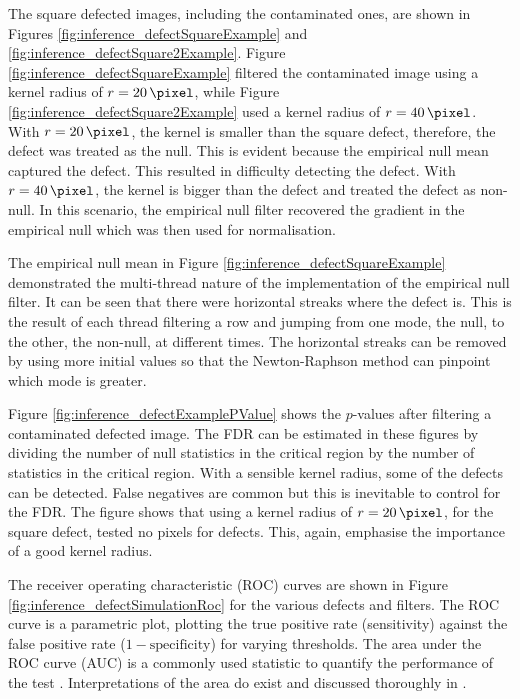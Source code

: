 The square defected images, including the contaminated ones, are shown in Figures \ref{fig:inference_defectSquareExample} and \ref{fig:inference_defectSquare2Example}. Figure \ref{fig:inference_defectSquareExample} filtered the contaminated image using a kernel radius of $r=\SI{20}{\pixel}$, while Figure \ref{fig:inference_defectSquare2Example} used a kernel radius of $r=\SI{40}{\pixel}$. With $r=\SI{20}{\pixel}$, the kernel is smaller than the square defect, therefore, the defect was treated as the null. This is evident because the empirical null mean captured the defect. This resulted in difficulty detecting the defect. With $r=\SI{40}{\pixel}$, the kernel is bigger than the defect and treated the defect as non-null. In this scenario, the empirical null filter recovered the gradient in the empirical null which was then used for normalisation.

The empirical null mean in Figure \ref{fig:inference_defectSquareExample} demonstrated the multi-thread nature of the implementation of the empirical null filter. It can be seen that there were horizontal streaks where the defect is. This is the result of each thread filtering a row and jumping from one mode, the null, to the other, the non-null, at different times. The horizontal streaks can be removed by using more initial values so that the Newton-Raphson method can pinpoint which mode is greater.

Figure \ref{fig:inference_defectExamplePValue} shows the $p$-values after filtering a contaminated defected image. The FDR can be estimated in these figures by dividing the number of null statistics in the critical region by the number of statistics in the critical region. With a sensible kernel radius, some of the defects can be detected. False negatives are common but this is inevitable to control for the FDR. The figure shows that using a kernel radius of $r=\SI{20}{\pixel}$, for the square defect, tested no pixels for defects. This, again, emphasise the importance of a good kernel radius. 

The receiver operating characteristic (ROC) curves \citep{green1966signal, metz1978basic, hanley1982meaning, friedman2001elements, cook2007use} are shown in Figure \ref{fig:inference_defectSimulationRoc} for the various defects and filters. The ROC curve is a parametric plot, plotting the true positive rate (sensitivity) against the false positive rate ($1-\text{specificity}$) for varying thresholds. The area under the ROC curve (AUC) is a commonly used statistic to quantify the performance of the test \citep{friedman2001elements}. Interpretations of the area do exist \citep{metz1978basic,hanley1982meaning} and discussed thoroughly in \cite{cook2007use}.

